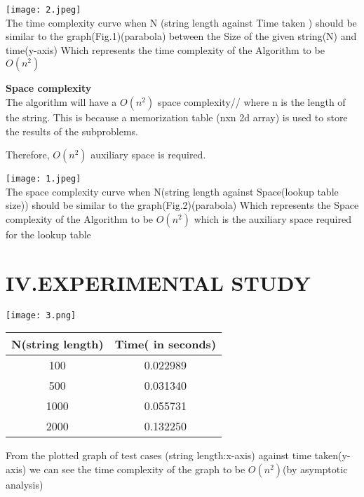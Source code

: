 \documentclass[twocolumn]{article}
\begin{document}
\texttt{[image: 2.jpeg]}
\\
The time complexity curve when N (string length against Time taken ) should be similar to the graph(Fig.1)(parabola)  between the Size of the given string(N) and time(y-axis)
Which represents  the time complexity of the Algorithm to be $O(n^2)$


\noindent \textbf{Space complexity}\\
The algorithm will have a $O(n^2)$ space complexity//
where n is the length of the string.  This is because a memorization table (nxn 2d array) is used to store the results of the subproblems. 

Therefore,  $O(n^2)$ auxiliary space is required.

\texttt{[image: 1.jpeg]}
\\
The space complexity curve when N(string length against Space(lookup table size)) should be similar to the graph(Fig.2)(parabola)
Which represents  the Space complexity
 of the Algorithm to be $O(n^2)$ which is the auxiliary space required for the lookup table

\section*{IV.EXPERIMENTAL STUDY
}
\texttt{[image: 3.png]}

\begin{center}
	\begin{tabular}{ |c | c | }
	\hline
	
N(string length)&
Time( in seconds)



 \\
	 \hline

100&
0.022989

\\
	\hline

500&
0.031340

\\
\hline

1000&
0.055731

\\
\hline

2000&
0.132250

\\
\hline
	\end{tabular}
\end{center}

From the plotted graph of  test cases (string length:x-axis) against time taken(y-axis)  we can see the time complexity of the graph to be $O(n^2)$(by asymptotic analysis)
\end{document}
